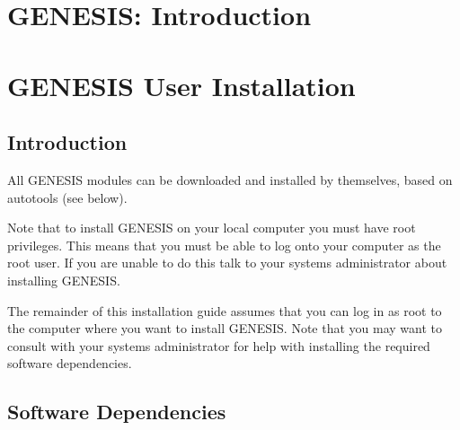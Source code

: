 \documentclass[12pt]{article}
\begin{document}
\section*{GENESIS: Introduction}

\section*{GENESIS User Installation}

\subsection*{Introduction}

All GENESIS modules can be downloaded and installed by themselves, based on autotools (see below). 

Note that to install GENESIS on your local computer you must have root privileges. This means that you must be able to log onto your computer as the root user. If you are unable to do this talk to your systems administrator about installing GENESIS.

The remainder of this installation guide assumes that you can log in as root to the computer where you want to install GENESIS. Note that you may want to consult with your systems administrator for help with installing the required software dependencies. 


\subsection*{Software Dependencies}
\end{document}
